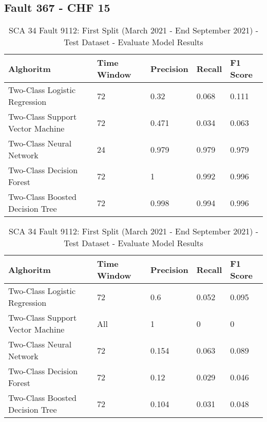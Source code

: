 \subsection{Fault 367 - CHF 15}

\begin{table}[!ht]
    \centering
    \begin{tabular}{|l|l|l|l|l|}
    \hline
        Alghoritm & Time Window & Precision & Recall & F1 Score \\ \hline
        Two-Class Logistic Regression & 72 & 0.32 & 0.068 & 0.111 \\ \hline
        Two-Class Support Vector Machine & 72 & 0.471 & 0.034 & 0.063 \\ \hline
        Two-Class Neural Network & 24 & 0.979 & 0.979 & 0.979 \\ \hline
        Two-Class Decision Forest & 72 & 1 & 0.992 & 0.996 \\ \hline
        Two-Class Boosted Decision Tree & 72 & 0.998 & 0.994 & 0.996 \\ \hline
    \end{tabular}
    \caption{SCA 34 Fault 9112: First Split (March 2021 - End September 2021) - Test Dataset - Evaluate Model Results}
    \label{9112_SCA34_1st}
\end{table}

\begin{table}[!ht]
    \centering
    \begin{tabular}{|l|l|l|l|l|}
    \hline
        Alghoritm & Time Window & Precision & Recall & F1 Score \\ \hline
        Two-Class Logistic Regression & 72 & 0.6 & 0.052 & 0.095 \\ \hline
        Two-Class Support Vector Machine & All & 1 & 0 & 0 \\ \hline
        Two-Class Neural Network & 72 & 0.154 & 0.063 & 0.089 \\ \hline
        Two-Class Decision Forest & 72 & 0.12 & 0.029 & 0.046 \\ \hline
        Two-Class Boosted Decision Tree & 72 & 0.104 & 0.031 & 0.048 \\ \hline
    \end{tabular}
    \caption{SCA 34 Fault 9112: First Split (March 2021 - End September 2021) - Test Dataset - Evaluate Model Results}
    \label{9112_SCA34_1st}
\end{table}


